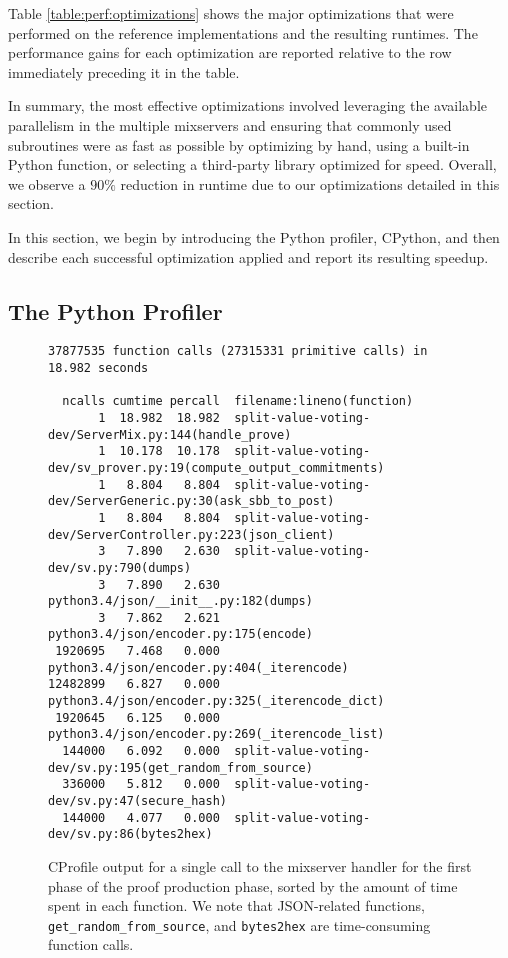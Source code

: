 Table \ref{table:perf:optimizations} shows the major optimizations that were performed on the reference implementations and the resulting runtimes. The performance gains for each optimization are reported relative to the row immediately preceding it in the table.

In summary, the most effective optimizations involved leveraging the available parallelism in the multiple mixservers and ensuring that commonly used subroutines were as fast as possible by optimizing by hand, using a built-in Python function, or selecting a third-party library optimized for speed. Overall, we observe a $90\%$ reduction in runtime due to our optimizations detailed in this section.

In this section, we begin by introducing the Python profiler, CPython, and then describe each successful optimization applied and report its resulting speedup.

\subsection{The Python Profiler} \label{perf:optimizations:profiler}

\begin{figure}[htbp]
\begin{lstlisting}[style=base]
37877535 function calls (27315331 primitive calls) in 18.982 seconds

  ncalls cumtime percall  filename:lineno(function)
       1  18.982  18.982  split-value-voting-dev/ServerMix.py:144(handle_prove)
       1  10.178  10.178  split-value-voting-dev/sv_prover.py:19(compute_output_commitments)
       1   8.804   8.804  split-value-voting-dev/ServerGeneric.py:30(ask_sbb_to_post)
       1   8.804   8.804  split-value-voting-dev/ServerController.py:223(json_client)
       3   7.890   2.630  split-value-voting-dev/sv.py:790(dumps)
       3   7.890   2.630  python3.4/json/__init__.py:182(dumps)
       3   7.862   2.621  python3.4/json/encoder.py:175(encode)
 1920695   7.468   0.000  python3.4/json/encoder.py:404(_iterencode)
12482899   6.827   0.000  python3.4/json/encoder.py:325(_iterencode_dict)
 1920645   6.125   0.000  python3.4/json/encoder.py:269(_iterencode_list)
  144000   6.092   0.000  split-value-voting-dev/sv.py:195(get_random_from_source)
  336000   5.812   0.000  split-value-voting-dev/sv.py:47(secure_hash)
  144000   4.077   0.000  split-value-voting-dev/sv.py:86(bytes2hex)
\end{lstlisting}
\caption[CProfile output for a single call to a mixserver handler]{CProfile output for a single call to the mixserver handler for the first phase of the proof production phase, sorted by the amount of time spent in each function. We note that JSON-related functions, \texttt{get\_random\_from\_source}, and \texttt{bytes2hex} are time-consuming function calls.}
\label{figure:perf:optimizations:profiler}
\end{figure}

